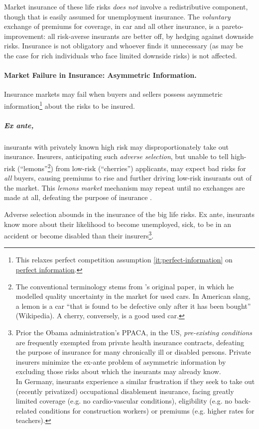 Market insurance of these life risks \emph{does not} involve a redistributive component, though that is easily assumed for unemployment insurance. The \emph{voluntary} exchange of premiums for coverage, in car and all other insurance, is a pareto-improvement: all risk-averse insurants are better off, by hedging against downside risks. Insurance is not obligatory and whoever finds it unnecessary (as may be the case for rich individuals who face limited downside risks) is not affected.

\paragraph{Market Failure in Insurance: Asymmetric Information.}
\label{sec:asymmetric-information}

Insurance markets may fail when buyers and sellers possess asymmetric information\footnote{
	This relaxes perfect competition assumption \ref{it:perfect-information} on \hyperref[it:perfect-information]{perfect information}.} 
about the risks to be insured. 

\subparagraph[Adverse Selection]{Ex ante,} \label{sec:adverse-selection} insurants with privately known high risk may disproportionately take out insurance. Insurers, anticipating such \emph{adverse selection}, but unable to tell high-risk (``lemons''\footnote{
	The conventional terminology stems from \citeauthor{Akerlof-1970-aa}'s original paper, in which he modelled  quality uncertainty in the market for used cars. In American slang, a lemon is a car ``that is found to be defective only after it has been bought'' (Wikipedia). A cherry, conversely, is a good used car.}) 
from low-risk (``cherries'') applicants,  may expect bad risks for \emph{all} buyers, causing premiums to rise and further driving low-risk insurants out of the market. This \emph{lemons market} mechanism may repeat until no exchanges are made at all, defeating the purpose of insurance \citep{Akerlof-1970-aa}. 

Adverse selection abounds in the insurance of the big life risks. Ex ante, insurants know more about their likelihood to become unemployed, sick, to be in an accident or become disabled than their insurers\footnote{
	Prior the Obama administration's \gls{PPACA}, in the US, \emph{pre-existing conditions} are frequently exempted from private health insurance contracts, defeating the purpose of insurance for many chronically ill or disabled persons. Private insurers minimize the ex-ante problem of asymmetric information by excluding those risks about which the insurants may already know.\\ 
	In Germany, insurants experience a similar frustration if they seek to take out (recently privatized) occupational disablement insurance, facing greatly limited coverage (e.g. no cardio-vascular conditions), eligibility (e.g. no back-related conditions for construction workers) or premiums (e.g. higher rates for teachers).}. 

